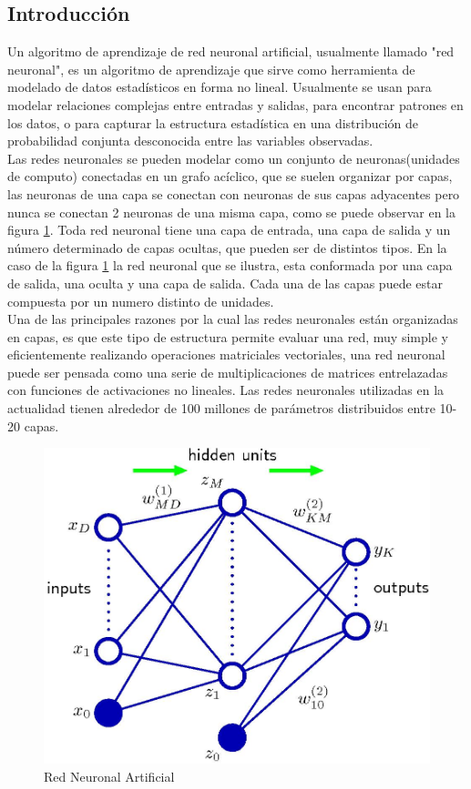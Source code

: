 \documentclass[a4paper,11pt,spanish]{book}
\begin{document}
      \subsection{Introducción}
	Un algoritmo de aprendizaje de red neuronal artificial, usualmente llamado "red neuronal", es un algoritmo de aprendizaje  que sirve como herramienta de modelado de datos 
	estadísticos en forma no lineal. Usualmente se usan para modelar relaciones complejas entre entradas y salidas,
	para encontrar patrones en los datos, o para capturar la estructura estadística en una distribución de probabilidad conjunta desconocida entre las variables observadas. \\
	Las redes neuronales se pueden modelar como un conjunto de neuronas(unidades de computo) conectadas en un grafo acíclico, que se suelen organizar por capas, las neuronas de una capa
	se conectan con neuronas de sus capas adyacentes pero nunca se conectan 2 neuronas de una misma capa, como se puede observar en la figura \ref{fig:neural_network}.
	Toda red neuronal tiene una capa de entrada, una capa de salida y un número determinado de capas ocultas, que pueden ser de distintos tipos. En la caso de la figura \ref{fig:neural_network}
	la red neuronal que se ilustra, esta conformada por una capa de salida, una oculta y una capa de salida. Cada una de las capas puede estar compuesta por un numero distinto de
	unidades.\\
	Una de las principales razones por la cual las redes neuronales están organizadas en capas, es que este tipo de estructura permite evaluar una red, muy simple y eficientemente realizando
	operaciones matriciales vectoriales, una red neuronal puede ser pensada como una serie de multiplicaciones de matrices entrelazadas con funciones de activaciones no lineales.
	Las redes neuronales utilizadas en la actualidad tienen alrededor de 100 millones de parámetros distribuidos entre 10-20 capas.
	\begin{figure}[H]
	  \begin{center}
	    \includegraphics[width=0.8\linewidth]{./img/bishop_neural_network.jpg}
	  \end{center}
	  \caption{Red Neuronal Artificial}
	  \label{fig:neural_network}
	\end{figure}
      
\end{document}
